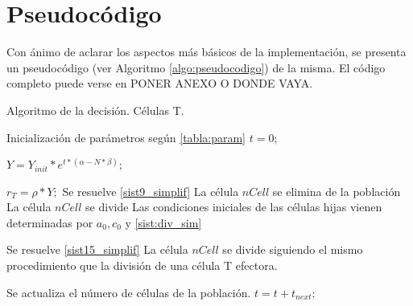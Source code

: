\section{Pseudocódigo}

Con ánimo de aclarar los aspectos más básicos de la implementación, se presenta un pseudocódigo (ver Algoritmo \ref{algo:pseudocodigo}) de la misma. El código completo puede verse en PONER ANEXO O DONDE VAYA.


\begin{algorithm}
	\caption{Algoritmo de la decisión. Células T.}
	\label{algo:pseudocodigo}
	\begin{algorithmic}[1]
		
		
		\State Inicialización de parámetros según \ref{tabla:param}
		\State $t = 0;$ 
		
		  
		\State $Y = Y_{init}*e^{t*(\alpha - N*\beta)};$ 
		
		 
			\State $ r_{T}=\rho*Y;$ 
			 
				\State Se resuelve \ref{sist9_simplif}
					\State La célula $nCell$ se elimina de la población
					\State La célula $nCell$ se divide
					\State Las condiciones iniciales de las células hijas vienen determinadas por $a_0, c_0$ y \ref{sist:div_sim}
				\EndIf
			
			 
				\State Se resuelve \ref{sist15_simplif}
					\State La célula $nCell$ se divide siguiendo el mismo procedimiento que la división de una célula T efectora. 
				\EndIf
			\EndIf
		\EndFor
		
		\State Se actualiza el número de células de la población.
		\State $t = t + t_{next};$
		
		\EndWhile
		
	\end{algorithmic}
\end{algorithm}

